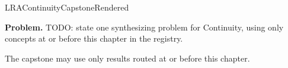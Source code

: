 \ifcsname LRAContinuityCapstoneRendered\endcsname
\else
\expandafter\gdef\csname LRAContinuityCapstoneRendered\endcsname{}

\newpage
{}
\label{cap:continuity}

\begin{tcolorbox}[
  colback=gray!6,
  colframe=gray!40,
  arc=2pt,
  left=8pt, right=8pt, top=6pt, bottom=6pt,
  title={\small\textbf{Capstone Problem}},
  fonttitle=\small\bfseries
]
\textbf{Problem.}
TODO: state one synthesizing problem for Continuity, using only concepts at or
before this chapter in the registry.
\end{tcolorbox}

\begin{remark*}
The capstone may use only results routed at or before this chapter.
\end{remark*}

\clearpage
\fi
